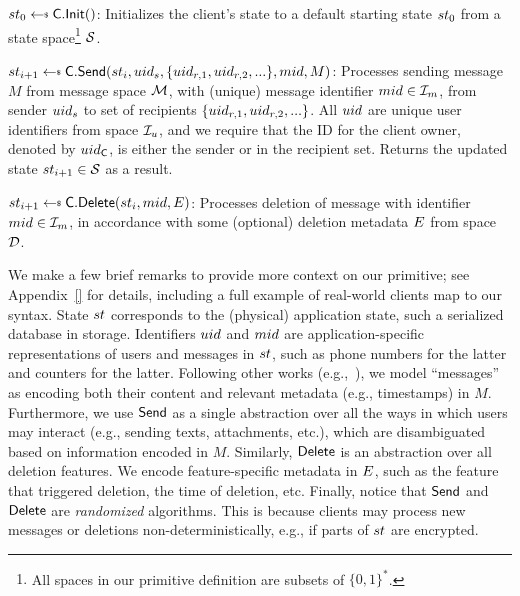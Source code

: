 \begin{newitemize}
    \item $\appState_0 \getsr \client.\Init()$: Initializes the client's state to a default starting state $st_0$ from a state space\footnote{All spaces in our primitive definition are subsets of $\{0, 1\}^*$.} $\mathcal{S}$.
    \item $\appState_{i+1} \getsr \client.\Send(\appState_i, \userId_s, \{\userId_{r, 1}, \userId_{r, 2}, ...\}, \messageId, M)$: 
    Processes sending message $M$ from message space $\mathcal{M}$, with (unique) message identifier $mid \in \mathcal{I}_m$, from sender $uid_s$ to set of recipients $\{uid_{r, 1}, uid_{r, 2}, ...\}$. All $uid$ are unique user identifiers from space $\mathcal{I}_u$, and we require that the ID for the client owner, denoted by $uid_{\mathsf{C}}$, is either the sender or in the recipient set. Returns the updated state $st_{i+1} \in \mathcal{S}$ as a result.
    \item $\appState_{i+1} \getsr \client.\Delete(\appState_i, \messageId, \deletionMetadata)$: Processes deletion of message with identifier $mid \in \mathcal{I}_m$, in accordance with some (optional) deletion metadata $E$ from space $\mathcal{D}$.
\end{newitemize}
We make a few brief remarks to provide more context on our primitive; see Appendix~\ref{} ƒor details, including a full example of real-world clients map to our syntax. 
State $st$ corresponds to the (physical) application state, such a serialized database in storage. Identifiers $uid$ and $mid$ are application-specific representations of users and messages in $st$, such as phone numbers for the latter and counters for the latter. Following other works (e.g.,~\cite{e2ee-cloud-storage,fabrega2025mitigating}), we model ``messages'' as encoding both their content and relevant metadata (e.g., timestamps) in $M$. Furthermore, we use $\mathsf{Send}$ as a single abstraction over all the ways in which users may interact (e.g., sending texts, attachments, etc.), which are disambiguated based on information encoded in $M$. Similarly, $\mathsf{Delete}$ is an abstraction over all deletion features. We encode feature-specific metadata in $E$, such as the feature that triggered deletion, the time of deletion, etc. Finally, notice that $\mathsf{Send}$ and $\mathsf{Delete}$ are \emph{randomized} algorithms. This is because clients may process new messages or deletions non-deterministically, e.g., if parts of $st$ are encrypted.

